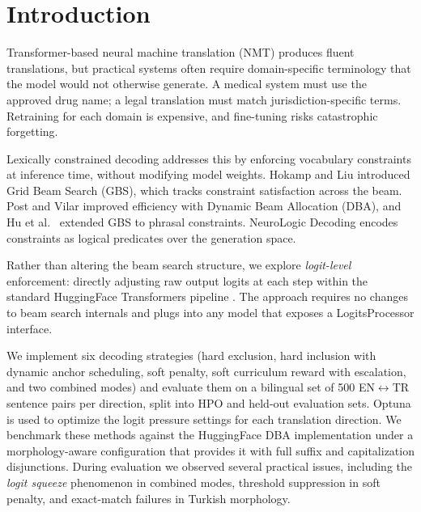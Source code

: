 \documentclass[conference]{IEEEtran}
\begin{document}
\section{Introduction}

Transformer-based neural machine translation (NMT) \cite{vaswani2017attention} produces fluent translations, but practical systems often require domain-specific terminology that the model would not otherwise generate. A medical system must use the approved drug name; a legal translation must match jurisdiction-specific terms. Retraining for each domain is expensive, and fine-tuning risks catastrophic forgetting.

Lexically constrained decoding addresses this by enforcing vocabulary constraints at inference time, without modifying model weights. Hokamp and Liu \cite{hokamp2017lexically} introduced Grid Beam Search (GBS), which tracks constraint satisfaction across the beam. Post and Vilar \cite{post2018fast} improved efficiency with Dynamic Beam Allocation (DBA), and Hu et al.~\cite{hu2019improved} extended GBS to phrasal constraints. NeuroLogic Decoding \cite{lu2021neurologic} encodes constraints as logical predicates over the generation space.

Rather than altering the beam search structure, we explore \emph{logit-level} enforcement: directly adjusting raw output logits at each step within the standard HuggingFace Transformers pipeline \cite{wolf2020transformers}. The approach requires no changes to beam search internals and plugs into any model that exposes a LogitsProcessor interface.

We implement six decoding strategies (hard exclusion, hard inclusion with dynamic anchor scheduling, soft penalty, soft curriculum reward with escalation, and two combined modes) and evaluate them on a bilingual set of 500 EN$\leftrightarrow$TR sentence pairs per direction, split into HPO and held-out evaluation sets. Optuna \cite{akiba2019optuna} is used to optimize the logit pressure settings for each translation direction. We benchmark these methods against the HuggingFace DBA implementation under a morphology-aware configuration that provides it with full suffix and capitalization disjunctions. During evaluation we observed several practical issues, including the \emph{logit squeeze} phenomenon in combined modes, threshold suppression in soft penalty, and exact-match failures in Turkish morphology.
\end{document}
